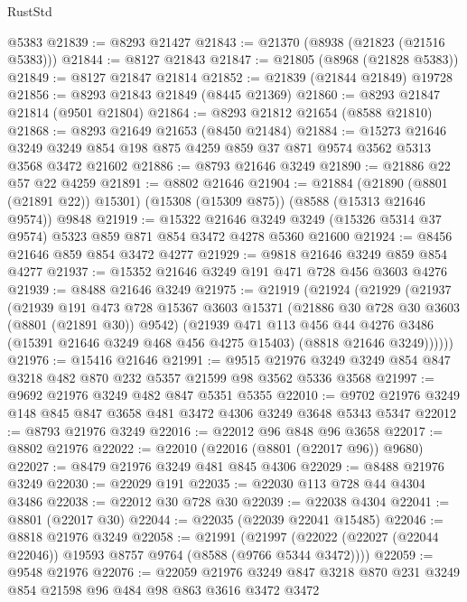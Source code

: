 \begin{lexlean}{RustStd}
\begin{coremodule}
    @5383
@21839 := @8293 @21427
@21843 := @21370 (@8938 (@21823 (@21516 @5383)))
@21844 := @8127 @21843
@21847 := @21805 (@8968 (@21828 @5383))
@21849 := @8127 @21847 @21814
@21852 := @21839 (@21844 @21849) @19728
@21856 := @8293 @21843 @21849 (@8445 @21369)
@21860 := @8293 @21847 @21814 (@9501 @21804)
@21864 := @8293 @21812 @21654 (@8588 @21810)
@21868 := @8293 @21649 @21653 (@8450 @21484)
@21884 := @15273
    @21646
    @3249
    @3249
    @854
    @198
    @875
    @4259
    @859
    @37
    @871
    @9574
    @3562
    @5313
    @3568
    @3472
    @21602
@21886 := @8793 @21646 @3249
@21890 := @21886 @22 @57 @22 @4259
@21891 := @8802 @21646
@21904 := @21884
    (@21890 (@8801 (@21891 @22)) @15301)
    (@15308 (@15309 @875))
    (@8588 (@15313 @21646 @9574))
    @9848
@21919 := @15322
    @21646
    @3249
    @3249
    (@15326 @5314 @37 @9574)
    @5323
    @859
    @871
    @854
    @3472
    @4278
    @5360
    @21600
@21924 := @8456 @21646 @859 @854 @3472 @4277
@21929 := @9818 @21646 @3249 @859 @854 @4277
@21937 := @15352 @21646 @3249 @191 @471 @728 @456 @3603 @4276
@21939 := @8488 @21646 @3249
@21975 := @21919
    (@21924
      (@21929
        (@21937
          (@21939
            @191
            @473
            @728
            @15367
            @3603
            @15371
            (@21886 @30 @728 @30 @3603 (@8801 (@21891 @30)) @9542)
            (@21939
              @471
              @113
              @456
              @44
              @4276
              @3486
              (@15391 @21646 @3249 @468 @456 @4275 @15403)
              (@8818 @21646 @3249))))))
@21976 := @15416 @21646
@21991 := @9515 @21976 @3249 @3249 @854 @847 @3218 @482 @870 @232 @5357 @21599 @98 @3562 @5336 @3568
@21997 := @9692 @21976 @3249 @482 @847 @5351 @5355
@22010 := @9702 @21976 @3249 @148 @845 @847 @3658 @481 @3472 @4306 @3249 @3648 @5343 @5347
@22012 := @8793 @21976 @3249
@22016 := @22012 @96 @848 @96 @3658
@22017 := @8802 @21976
@22022 := @22010 (@22016 (@8801 (@22017 @96)) @9680)
@22027 := @8479 @21976 @3249 @481 @845 @4306
@22029 := @8488 @21976 @3249
@22030 := @22029 @191
@22035 := @22030 @113 @728 @44 @4304 @3486
@22038 := @22012 @30 @728 @30
@22039 := @22038 @4304
@22041 := @8801 (@22017 @30)
@22044 := @22035 (@22039 @22041 @15485)
@22046 := @8818 @21976 @3249
@22058 := @21991
    (@21997 (@22022 (@22027 (@22044 @22046)) @19593 @8757 @9764 (@8588 (@9766 @5344 @3472))))
@22059 := @9548 @21976
@22076 := @22059
    @21976
    @3249
    @847
    @3218
    @870
    @231
    @3249
    @854
    @21598
    @96
    @484
    @98
    @863
    @3616
    @3472
    @3472

\end{coremodule}
\end{lexlean}

